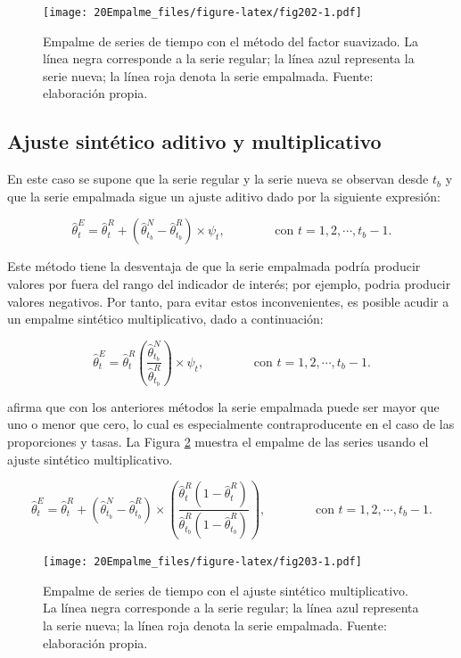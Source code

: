 \documentclass[
  12pt,
]{book}
\begin{document}
\begin{figure}
\centering
\texttt{[image: 20Empalme\_files/figure-latex/fig202-1.pdf]}
\caption{\label{fig:fig202}Empalme de series de tiempo con el método del factor suavizado. La línea negra corresponde a la serie regular; la línea azul representa la serie nueva; la línea roja denota la serie empalmada. Fuente: elaboración propia.}
\end{figure}

\hypertarget{ajuste-sintuxe9tico-aditivo-y-multiplicativo}{%
\subsection{Ajuste sintético aditivo y multiplicativo}\label{ajuste-sintuxe9tico-aditivo-y-multiplicativo}}

En este caso se supone que la serie regular y la serie nueva se observan desde \(t_b\) y que la serie empalmada sigue un ajuste aditivo dado por la siguiente expresión:

\[
\hat \theta^{E}_t=\hat \theta^{R}_t + \left(\hat \theta^{N}_{t_b} - \hat \theta^{R}_{t_b}\right) \times \psi_t
,
\ \ \ \ \ \ \ \ \ \ \ \ \ \ \ \ \ \ \text{con } t=1,2,\cdots,t_b-1.
\]

Este método tiene la desventaja de que la serie empalmada podría producir valores por fuera del rango del indicador de interés; por ejemplo, podria producir valores negativos. Por tanto, para evitar estos inconvenientes, es posible acudir a un empalme sintético multiplicativo, dado a continuación:

\[
\hat \theta^{E}_t=\hat \theta^{R}_t  \left(\dfrac{\hat \theta^{N}_{t_b}}{\hat \theta^{R}_{t_b}}\right)  \times \psi_t 
,
\ \ \ \ \ \ \ \ \ \ \ \ \ \ \ \ \ \ \text{con } t=1,2,\cdots,t_b-1.
\]

\citet{Brakel2008} afirma que con los anteriores métodos la serie empalmada puede ser mayor que uno o menor que cero, lo cual es especialmente contraproducente en el caso de las proporciones y tasas. La Figura \ref{fig:fig203} muestra el empalme de las series usando el ajuste sintético multiplicativo.

\[
\hat \theta^{E}_t=\hat \theta^{R}_t + \left(\hat \theta^{N}_{t_b} - \hat \theta^{R}_{t_b}\right) \times \left( \dfrac{\hat \theta^{R}_t(1-\hat \theta^{R}_t)}{\hat \theta^{R}_{t_b}(1-\hat \theta^{R}_{t_b})}\right) 
,
\ \ \ \ \ \ \ \ \ \ \ \ \ \ \ \ \ \ \text{con } t=1,2,\cdots,t_b-1.
\]

\begin{figure}
\centering
\texttt{[image: 20Empalme\_files/figure-latex/fig203-1.pdf]}
\caption{\label{fig:fig203}Empalme de series de tiempo con el ajuste sintético multiplicativo. La línea negra corresponde a la serie regular; la línea azul representa la serie nueva; la línea roja denota la serie empalmada. Fuente: elaboración propia.}
\end{figure}
\end{document}
